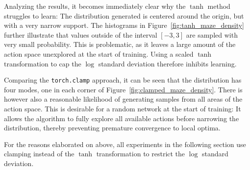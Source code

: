Analyzing the results, it becomes immediately clear why the $\tanh$ method struggles to learn: The distribution generated is centered around the origin, but with a very narrow support. The histograms in Figure~\ref{fig:tanh_maze_density} further illustrate that values outside of the interval $[-3, 3]$ are sampled with very small probability. This is problematic, as it leaves a large amount of the action space unexplored at the start of training. Using a scaled $\tanh$ transformation to cap the $\log$ standard deviation therefore inhibits learning.

Comparing the \texttt{torch.clamp} approach, it can be seen that the distribution has four modes, one in each corner of Figure~\ref{fig:clamped_maze_density}. There is however also a reasonable likelihood of generating samples from all areas of the action space. This is desirable for a random network at the start of training: It allows the algorithm to fully explore all available actions before narrowing the distribution, thereby preventing premature convergence to local optima.

For the reasons elaborated on above, all experiments in the following section use clamping instead of the $\tanh$ transformation to restrict the $\log$ standard deviation.


